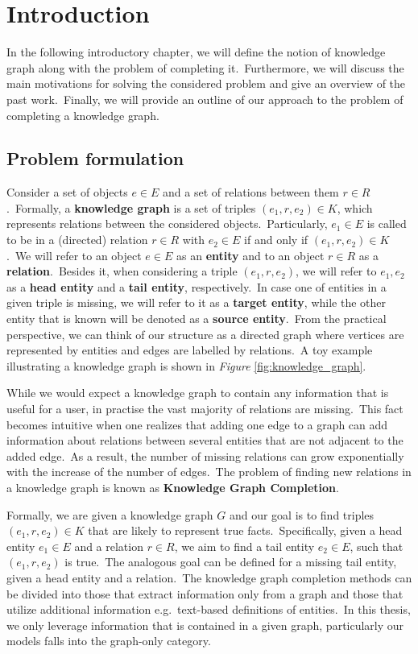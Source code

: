\documentclass[longabstract, english, mgr]{iithesis}
\author         {Dawid Wegner}
\date           {29 września 2021}
\newcommand\numberedchapter[1]{\setlength\topskip{3cm}\chapter{#1}\setlength\topskip{0cm}}
\theoremstyle{default_theorem_style}\newtheorem{theorem}{Theorem}
\theoremstyle{default_theorem_style}\newtheorem{definition}{Definition}
\begin{document}
\numberedchapter{Introduction}

In the following introductory chapter, we will define the notion of knowledge graph along with the problem of
completing it.\ Furthermore, we will discuss the main motivations for solving the considered problem and give an
overview of the past work.\ Finally, we will provide an outline of our approach to the problem of completing a
knowledge graph.

\section{Problem formulation}

Consider a set of objects $e \in E$ and a set of relations between them $r \in R$.\ Formally, a \textbf{knowledge graph}
is a set of triples $(e_1, r, e_2) \in K$, which represents relations between the considered objects.\ Particularly,
$e_1 \in E$ is called to be in a (directed) relation $r \in R$ with $e_2 \in E$ if and only if
$(e_1, r, e_2) \in K$.\ We will refer to an object $e \in E$ as an \textbf{entity} and to an object
$r \in R$ as a \textbf{relation}.\ Besides it, when considering a triple $(e_1, r, e_2)$, we will refer to
$e_1, e_2$ as a \textbf{head entity} and a \textbf{tail entity}, respectively.\ In case one of entities in a given
triple is missing, we will refer to it as a \textbf{target entity}, while the other entity that is known will be
denoted as a \textbf{source entity}.\ From the practical perspective, we can think of our structure as a directed graph
where vertices are represented by entities and edges are labelled by relations.\ A toy example illustrating a
knowledge graph is shown in \textit{Figure} \ref{fig:knowledge_graph}.\newline

\noindent While we would expect a knowledge graph to contain any information that is useful for a user, in practise
the vast majority of relations are missing.\ This fact becomes intuitive when one realizes that adding one edge
to a graph can add information about relations between several entities that are not adjacent to the added
edge.\ As a result, the number of missing relations can grow exponentially with the increase of the number of
edges.\ The problem of finding new relations in a knowledge graph is known
as \textbf{Knowledge Graph Completion}.\newline

\noindent Formally, we are given a knowledge graph $G$ and our goal is to find triples $(e_1, r, e_2) \in K$ that
are likely to represent true facts.\ Specifically, given a head entity $e_1 \in E$ and a relation $r \in R$, we
aim to find a tail entity $e_2 \in E$, such that $(e_1, r, e_2)$ is true.\ The analogous goal can be defined for
a missing tail entity, given a head entity and a relation.\ The knowledge graph completion methods can be divided
into those that extract information only from a graph and those that utilize additional information e.g.\ text-based
definitions of entities.\ In this thesis, we only leverage information that is contained in a given graph,
particularly our models falls into the graph-only category.
\end{document}

